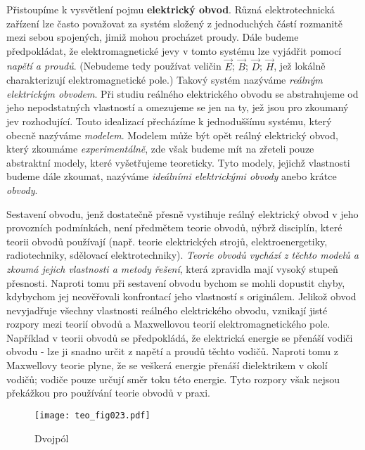       Přistoupíme k vysvětlení pojmu \textbf{elektrický obvod}. Různá elektrotechnická zařízení lze 
      často považovat za systém složený z jednoduchých částí rozmanitě mezi sebou spojených, jimiž 
      mohou procházet proudy. Dále budeme předpokládat, že elektromagnetické jevy v tomto systému 
      lze vyjádřit pomocí \emph{napětí a proudů}. (Nebudeme tedy používat veličin \(\vec{E}\); 
      \(\vec{B}\); \(\vec{D}\); \(\vec{H}\), jež lokálně charakterizují elektromagnetické pole.) 
      Takový systém nazýváme \emph{reálným elektrickým obvodem}. Při studiu reálného elektrického 
      obvodu se abstrahujeme od jeho nepodstatných vlastností a omezujeme se jen na ty, jež jsou 
      pro zkoumaný jev rozhodující. Touto idealizací přecházíme k jednoduššímu systému, který 
      obecně nazýváme \emph{modelem}. Modelem může být opět reálný elektrický obvod, který zkoumáme 
      \emph{experimentálně}, zde však budeme mít na zřeteli pouze abstraktní modely, které 
      vyšetřujeme teoreticky. Tyto modely, jejichž vlastnosti budeme dále zkoumat, nazýváme 
      \emph{ideálními elektrickými obvody} anebo krátce \emph{obvody}\cite[s.~19]{Meyer1978}.
      
      Sestavení obvodu, jenž dostatečně přesně vystihuje reálný elektrický obvod v jeho provozních 
      podmínkách, není předmětem teorie obvodů, nýbrž disciplín, které teorii obvodů používají 
      (např. teorie elektrických strojů, elektroenergetiky, radiotechniky, sdělovací 
      elektrotechniky). \emph{Teorie obvodů vychází z těchto modelů a zkoumá jejich vlastnosti a 
      metody řešení}, která zpravidla mají vysoký stupeň přesnosti. Naproti tomu při sestavení 
      obvodu bychom se mohli dopustit chyby, kdybychom jej neověřovali konfrontací jeho vlastností 
      s originálem. Jelikož obvod nevyjadřuje všechny vlastnosti reálného elektrického obvodu, 
      vznikají jisté rozpory mezi teorií obvodů a Maxwellovou teorií elektromagnetického pole. 
      Například v teorii obvodů se předpokládá, že elektrická energie se přenáší vodiči obvodu - 
      lze ji snadno určit z napětí a proudů těchto vodičů. Naproti tomu z Maxwellovy teorie plyne, 
      že se veškerá energie přenáší dielektrikem v okolí vodičů; vodiče pouze určují směr toku této 
      energie. Tyto rozpory však nejsou překážkou pro používání teorie obvodů v praxi.

      \begin{figure}[ht!]  %
        \centering
        \texttt{[image: teo\_fig023.pdf]}
        \caption{Dvojpól}
        \label{teo:fig023}
      \end{figure}

